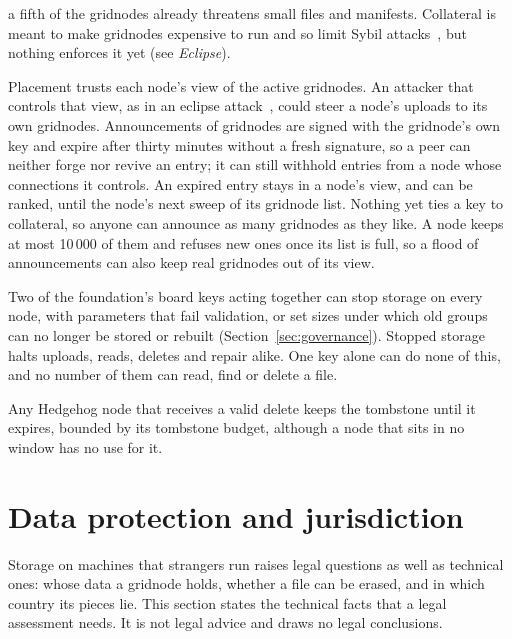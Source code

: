 \documentclass[10pt,a4paper,final]{article}
\begin{document}
\begin{description}
	      a fifth of the gridnodes already threatens small files and manifests. Collateral is meant to make
	      gridnodes expensive to run and so limit Sybil attacks~\cite{douceur2002}, but nothing enforces it yet (see
	      \emph{Eclipse}).
	\item[Eclipse] Placement trusts each node's view of the active gridnodes. An attacker that controls that view,
	      as in an eclipse attack~\cite{singh2006}, could steer a node's uploads to its own gridnodes.
	      Announcements of gridnodes are signed with the gridnode's own key and expire after thirty minutes
	      without a fresh signature, so a peer can neither forge nor revive an entry; it can still withhold
	      entries from a node whose connections it controls. An expired entry stays in a node's view, and can be
	      ranked, until the node's next sweep of its gridnode list. Nothing yet ties a key to collateral, so anyone
	      can announce as many gridnodes as they like. A node keeps at most 10\,000 of them and refuses new ones
	      once its list is full, so a flood of announcements can also keep real gridnodes out of its view.
	\item[Board keys] Two of the foundation's board keys acting together can stop storage on every node, with
	      parameters that fail validation, or set sizes under which old groups can no longer be stored or rebuilt
	      (Section~\ref{sec:governance}). Stopped storage halts uploads, reads, deletes and repair alike. One key
	      alone can do none of this, and no number of them can read, find or delete a file.
	\item[Tombstones on plain nodes] Any Hedgehog node that receives a valid delete keeps the tombstone until it
	      expires, bounded by its tombstone budget, although a node that sits in no window has no use for it.
\end{description}

\section{Data protection and jurisdiction}
\label{sec:jurisdiction}

Storage on machines that strangers run raises legal questions as well as technical ones: whose data a gridnode
holds, whether a file can be erased, and in which country its pieces lie. This section states the technical facts
that a legal assessment needs. It is not legal advice and draws no legal conclusions.
\end{document}
